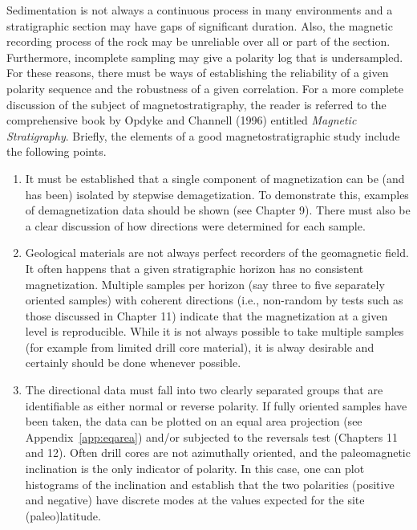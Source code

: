 Sedimentation is not always a continuous process in many environments
and a stratigraphic section may  have gaps of significant duration.
Also, the magnetic recording process of the rock may be unreliable
over all or part of the section.  Furthermore, incomplete sampling may give a
polarity log that is undersampled.  For these reasons, there must be
ways of establishing the reliability of a given polarity sequence and
the robustness of a given correlation. For a more complete discussion of 
the subject of magnetostratigraphy, the reader is referred to the comprehensive
book by 
%
%
Opdyke and Channell (1996)  entitled {\it Magnetic Stratigraphy}. Briefly,
the elements of a good magnetostratigraphic study include the
following points.
\nocite{opdyke96}

\begin{enumerate}
\item It must be established that a single component of magnetization can
be (and has been) isolated by stepwise demagetization.  To demonstrate this,
 examples of demagnetization
data should be shown (see Chapter 9).  There must also be
  a clear discussion of how directions were determined for each sample.

\item Geological materials are not always perfect recorders of the geomagnetic field.
It often happens that a given stratigraphic horizon has no consistent magnetization.
Multiple samples per horizon  (say three to five separately oriented samples)
with coherent directions (i.e., non-random by tests such as those discussed in 
Chapter 11)
indicate that the magnetization at a given level is reproducible. While it is not
always possible to take multiple samples (for example from limited drill core material),
it is alway desirable and certainly should be done whenever possible.

\item  The directional data must fall into two clearly separated groups
that are identifiable as either normal or 
reverse polarity.  If fully oriented samples have been
taken, the data can be plotted on an equal area projection
(see Appendix~\ref{app:eqarea}) and/or subjected to the
reversals test (Chapters 11 and 12).  Often drill cores are not azimuthally oriented,
and the paleomagnetic inclination is the only indicator of polarity.
 In this case, one can plot histograms of the inclination and establish that the two polarities (positive and negative) have discrete
modes at the values expected for the site (paleo)latitude.


\end{enumerate}
